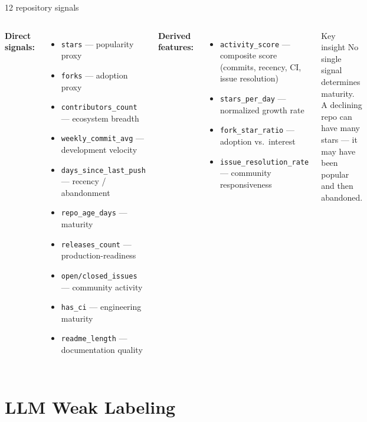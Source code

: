\begin{frame}{12 repository signals}

  \begin{columns}
    \textbf{Direct signals:}
    \begin{itemize}
      \item \texttt{stars} — popularity proxy
      \item \texttt{forks} — adoption proxy
      \item \texttt{contributors\_count} — ecosystem breadth
      \item \texttt{weekly\_commit\_avg} — development velocity
      \item \texttt{days\_since\_last\_push} — recency / abandonment
      \item \texttt{repo\_age\_days} — maturity
      \item \texttt{releases\_count} — production-readiness
      \item \texttt{open/closed\_issues} — community activity
      \item \texttt{has\_ci} — engineering maturity
      \item \texttt{readme\_length} — documentation quality
    \end{itemize}

    \textbf{Derived features:}
    \begin{itemize}
      \item \texttt{activity\_score} — composite score (commits, recency, CI, issue resolution)
      \item \texttt{stars\_per\_day} — normalized growth rate
      \item \texttt{fork\_star\_ratio} — adoption vs.\ interest
      \item \texttt{issue\_resolution\_rate} — community responsiveness
    \end{itemize}

    \bigskip
    \begin{block}{Key insight}
      No single signal determines maturity. A declining repo can have
      many stars — it may have been popular and then abandoned.
    \end{block}
  \end{columns}

\end{frame}

\section{LLM Weak Labeling}

